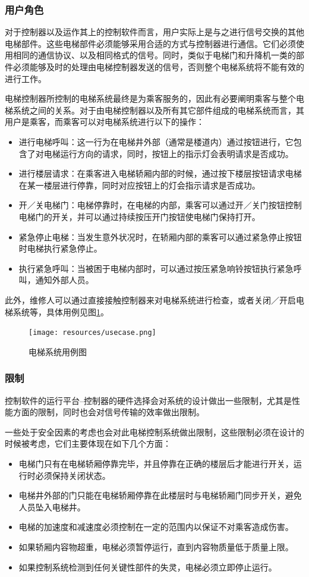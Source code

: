 \subsubsection{用户角色}
对于控制器以及运作其上的控制软件而言，用户实际上是与之进行信号交换的其他电梯部件。这些电梯部件必须能够采用合适的方式与控制器进行通信。它们必须使用相同的通信协议、以及相同格式的信号。同时，类似于电梯门和升降机一类的部件必须能够及时的处理由电梯控制器发送的信号，否则整个电梯系统将不能有效的进行工作。\par

电梯控制器所控制的电梯系统最终是为乘客服务的，因此有必要阐明乘客与整个电梯系统之间的关系。对于由电梯控制器以及所有其它部件组成的电梯系统而言，其用户是乘客，而乘客可以对电梯系统进行以下的操作：\par
\begin{itemize}
	\item 进行电梯呼叫：这一行为在电梯井外部（通常是楼道内）通过按钮进行，它包含了对电梯运行方向的请求，同时，按钮上的指示灯会表明请求是否成功。
	\item 进行楼层请求：在乘客进入电梯轿厢内部的时候，通过按下楼层按钮请求电梯在某一楼层进行停靠，同时对应按钮上的灯会指示请求是否成功。
	\item 开／关电梯门：电梯停靠时，在电梯的内部，乘客可以通过开／关门按钮控制电梯门的开关，并可以通过持续按压开门按钮使电梯门保持打开。
	\item 紧急停止电梯：当发生意外状况时，在轿厢内部的乘客可以通过紧急停止按钮时电梯执行紧急停止。
	\item 执行紧急呼叫：当被困于电梯内部时，可以通过按压紧急响铃按钮执行紧急呼叫，通知外部人员。
\end{itemize} \par
此外，维修人可以通过直接接触控制器来对电梯系统进行检查，或者关闭／开启电梯系统等，具体用例见图\ref{fig:usecase}。
\begin{figure}[H]
	\centering
	\texttt{[image: resources/usecase.png]}
	\caption{电梯系统用例图}
	\label{fig:usecase}
\end{figure}

\subsubsection{限制}
控制软件的运行平台--控制器的硬件选择会对系统的设计做出一些限制，尤其是性能方面的限制，同时也会对信号传输的效率做出限制。\par

一些处于安全因素的考虑也会对此电梯控制系统做出限制，这些限制必须在设计的时候被考虑，它们主要体现在如下几个方面：
\begin{itemize}
	\item 电梯门只有在电梯轿厢停靠完毕，并且停靠在正确的楼层后才能进行开关，运行时必须保持关闭状态。
	\item 电梯井外部的门只能在电梯轿厢停靠在此楼层时与电梯轿厢门同步开关，避免人员坠入电梯井。
	\item 电梯的加速度和减速度必须控制在一定的范围内以保证不对乘客造成伤害。
	\item 如果轿厢内容物超重，电梯必须暂停运行，直到内容物质量低于质量上限。
	\item 如果控制系统检测到任何关键性部件的失灵，电梯必须立即停止运行。
\end{itemize}

